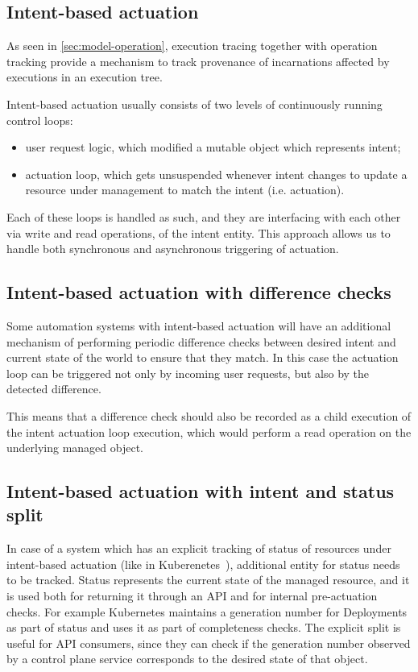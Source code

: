 \subsection{Intent-based actuation}

As seen in \cref{sec:model-operation}, execution tracing together with operation tracking provide a mechanism to track provenance of incarnations affected by executions in an execution tree. 

Intent-based actuation usually consists of two levels of continuously running control loops:
%
\begin{itemize}
	\item user request logic, which modified a mutable object which represents intent;
	\item actuation loop, which gets unsuspended whenever intent changes to update a resource under management to match the intent (i.e. actuation).
\end{itemize}

Each of these loops is handled as such, and they are interfacing with each other via write and read operations, of the intent entity. This approach allows us to handle both synchronous and asynchronous triggering of actuation.


\subsection{Intent-based actuation with difference checks}

Some automation systems with intent-based actuation will have an additional mechanism of performing periodic difference checks between desired intent and current state of the world to ensure that they match. In this case the actuation loop can be triggered not only by incoming user requests, but also by the detected difference.

This means that a difference check should also be recorded as a child execution of the intent actuation loop execution, which would perform a read operation on the underlying managed object.


\subsection{Intent-based actuation with intent and status split}\label{sec:intent-with-split}

In case of a system which has an explicit tracking of status of resources under intent-based actuation (like in Kuberenetes~\cite{k8sObjects2020}), additional entity for status needs to be tracked. Status represents the current state of the managed resource, and it is used both for returning it through an API and for internal pre-actuation checks. For example Kubernetes maintains a generation number for Deployments as part of status and uses it as part of completeness checks. The explicit split is useful for API consumers, since they can check if the generation number observed by a control plane service corresponds to the desired state of that object.

